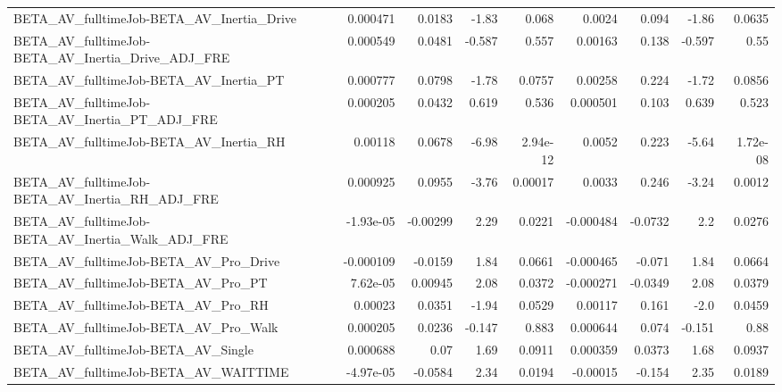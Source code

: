 \begin{tabular}{lrrrrrrrr}
BETA\_AV\_fulltimeJob-BETA\_AV\_Inertia\_Drive          &    0.000471 &       0.0183 &    -1.83 &    0.068 &     0.0024 &       0.094 &        -1.86 &        0.0635 \\
BETA\_AV\_fulltimeJob-BETA\_AV\_Inertia\_Drive\_ADJ\_FRE  &    0.000549 &       0.0481 &   -0.587 &    0.557 &    0.00163 &       0.138 &       -0.597 &          0.55 \\
BETA\_AV\_fulltimeJob-BETA\_AV\_Inertia\_PT             &    0.000777 &       0.0798 &    -1.78 &   0.0757 &    0.00258 &       0.224 &        -1.72 &        0.0856 \\
BETA\_AV\_fulltimeJob-BETA\_AV\_Inertia\_PT\_ADJ\_FRE     &    0.000205 &       0.0432 &    0.619 &    0.536 &   0.000501 &       0.103 &        0.639 &         0.523 \\
BETA\_AV\_fulltimeJob-BETA\_AV\_Inertia\_RH             &     0.00118 &       0.0678 &    -6.98 & 2.94e-12 &     0.0052 &       0.223 &        -5.64 &      1.72e-08 \\
BETA\_AV\_fulltimeJob-BETA\_AV\_Inertia\_RH\_ADJ\_FRE     &    0.000925 &       0.0955 &    -3.76 &  0.00017 &     0.0033 &       0.246 &        -3.24 &        0.0012 \\
BETA\_AV\_fulltimeJob-BETA\_AV\_Inertia\_Walk\_ADJ\_FRE   &   -1.93e-05 &     -0.00299 &     2.29 &   0.0221 &  -0.000484 &     -0.0732 &          2.2 &        0.0276 \\
BETA\_AV\_fulltimeJob-BETA\_AV\_Pro\_Drive              &   -0.000109 &      -0.0159 &     1.84 &   0.0661 &  -0.000465 &      -0.071 &         1.84 &        0.0664 \\
BETA\_AV\_fulltimeJob-BETA\_AV\_Pro\_PT                 &    7.62e-05 &      0.00945 &     2.08 &   0.0372 &  -0.000271 &     -0.0349 &         2.08 &        0.0379 \\
BETA\_AV\_fulltimeJob-BETA\_AV\_Pro\_RH                 &     0.00023 &       0.0351 &    -1.94 &   0.0529 &    0.00117 &       0.161 &         -2.0 &        0.0459 \\
BETA\_AV\_fulltimeJob-BETA\_AV\_Pro\_Walk               &    0.000205 &       0.0236 &   -0.147 &    0.883 &   0.000644 &       0.074 &       -0.151 &          0.88 \\
BETA\_AV\_fulltimeJob-BETA\_AV\_Single                 &    0.000688 &         0.07 &     1.69 &   0.0911 &   0.000359 &      0.0373 &         1.68 &        0.0937 \\
BETA\_AV\_fulltimeJob-BETA\_AV\_WAITTIME               &   -4.97e-05 &      -0.0584 &     2.34 &   0.0194 &   -0.00015 &      -0.154 &         2.35 &        0.0189 \\

\end{tabular}
